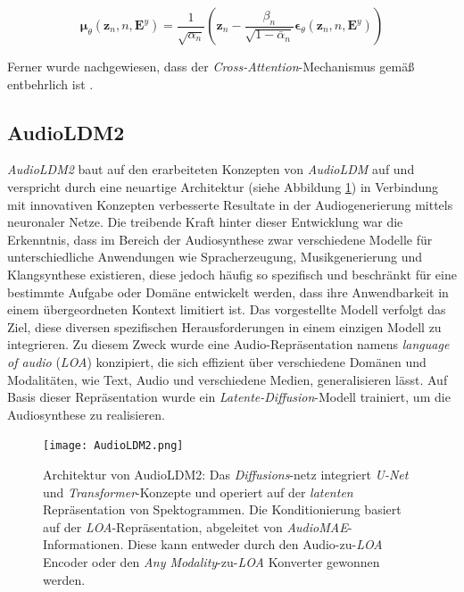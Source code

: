 \documentclass[
  a4paper,  %
  twoside,  %
  bibliography=totoc,
  headsepline,
  cleardoublepage=empty,
  parskip=half,
  draft=false
]{scrbook}
\begin{document}
{\begin{equation}
    \boldsymbol{\mu}_\theta\left(\boldsymbol{z}_n, n, \boldsymbol{E}^y\right)=\frac{1}{\sqrt{\alpha_n}}\left(\boldsymbol{z}_n-\frac{\beta_n}{\sqrt{1-\bar{\alpha}_n}} \boldsymbol{\epsilon}_\theta\left(\boldsymbol{z}_n, n, \boldsymbol{E}^y\right)\right)
\end{equation}

Ferner wurde nachgewiesen, dass der \emph{Cross-Attention}-Mechanismus gemäß \cite{rombach_high-resolution_2022} entbehrlich ist \cite{liu_audioldm_2023}.

\subsection{AudioLDM2}

\emph{AudioLDM2} \cite{liu_audioldm2_2023} baut auf den erarbeiteten Konzepten von \emph{AudioLDM} \cite{liu_audioldm_2023} auf und verspricht durch eine neuartige Architektur (siehe Abbildung \ref{fig:AudioLDM2}) in Verbindung mit innovativen Konzepten verbesserte Resultate in der Audiogenerierung mittels neuronaler Netze. Die treibende Kraft hinter dieser Entwicklung war die Erkenntnis, dass im Bereich der Audiosynthese zwar verschiedene Modelle für unterschiedliche Anwendungen wie Spracherzeugung, Musikgenerierung und Klangsynthese existieren, diese jedoch häufig so spezifisch und beschränkt für eine bestimmte Aufgabe oder Domäne entwickelt werden, dass ihre Anwendbarkeit in einem übergeordneten Kontext limitiert ist. Das vorgestellte Modell verfolgt das Ziel, diese diversen spezifischen Herausforderungen in einem einzigen Modell zu integrieren. Zu diesem Zweck wurde eine Audio-Repräsentation namens \emph{language of audio} (\emph{LOA}) konzipiert, die sich effizient über verschiedene Domänen und Modalitäten, wie Text, Audio und verschiedene Medien, generalisieren lässt. Auf Basis dieser Repräsentation wurde ein \emph{Latente-Diffusion}-Modell trainiert, um die Audiosynthese zu realisieren. \cite{liu_audioldm2_2023}

\begin{figure}[h]
  \centering
  \texttt{[image: AudioLDM2.png]}
  \caption[AudioLDM2 Architektur]{Architektur von AudioLDM2: Das \emph{Diffusions}-netz integriert \emph{U-Net} und \emph{Transformer}-Konzepte und operiert auf der \emph{latenten} Repräsentation von Spektogrammen. Die Konditionierung basiert auf der \emph{LOA}-Repräsentation, abgeleitet von \emph{AudioMAE}-Informationen. Diese kann entweder durch den Audio-zu-\emph{LOA} Encoder oder den \emph{Any Modality}-zu-\emph{LOA} Konverter gewonnen werden. \cite{liu_audioldm2_2023}}
  \label{fig:AudioLDM2}
\end{figure} 

}
\end{document}
